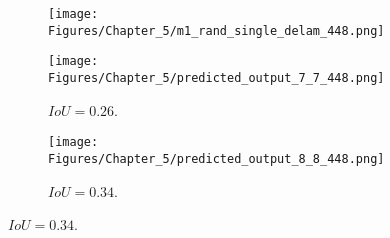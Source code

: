 \begin{figure} [h!]
	\centering
	\begin{subfigure}[b]{0.32\textwidth}
		\centering
		\texttt{[image: Figures/Chapter\_5/m1\_rand\_single\_delam\_448.png]}
		\caption{}
		\label{fig:GT_case_448}
	\end{subfigure}	
	\hfill
	\begin{subfigure}[b]{0.32\textwidth}
		\centering
		\texttt{[image: Figures/Chapter\_5/predicted\_output\_7\_7\_448.png]}
		\caption{\(IoU=0.26\).}
		\label{fig:pred_7_7_case_448}
	\end{subfigure}
	\hfill
	\begin{subfigure}[b]{0.32\textwidth}
		\centering
		\texttt{[image: Figures/Chapter\_5/predicted\_output\_8\_8\_448.png]}
		\caption{\(IoU=0.34\).}
		\label{fig:pred_8_8_case_448}
	\end{subfigure}	


\end{figure}
